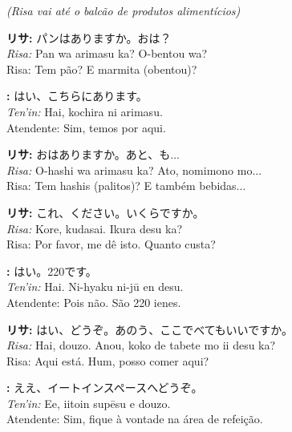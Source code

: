 \documentclass[12pt,a4paper]{article}
\begin{document}
\vspace{0.8em}
\textit{(Risa vai até o balcão de produtos alimentícios)}
\vspace{0.8em}

\textbf{リサ:} パンはありますか。おは？\\
\textit{Risa:} Pan wa arimasu ka? O-bentou wa?\\
Risa: Tem pão? E marmita (obentou)?

\vspace{0.5em}

\textbf{:} はい、こちらにあります。\\
\textit{Ten'in:} Hai, kochira ni arimasu.\\
Atendente: Sim, temos por aqui.

\vspace{0.5em}

\textbf{リサ:} おはありますか。あと、も...\\
\textit{Risa:} O-hashi wa arimasu ka? Ato, nomimono mo...\\
Risa: Tem hashis (palitos)? E também bebidas...

\vspace{0.5em}

\textbf{リサ:} これ、ください。いくらですか。\\
\textit{Risa:} Kore, kudasai. Ikura desu ka?\\
Risa: Por favor, me dê isto. Quanto custa?

\vspace{0.5em}

\textbf{:} はい。220です。\\
\textit{Ten'in:} Hai. Ni-hyaku ni-jū en desu.\\
Atendente: Pois não. São 220 ienes.

\vspace{0.5em}

\textbf{リサ:} はい、どうぞ。あのう、ここでべてもいいですか。\\
\textit{Risa:} Hai, douzo. Anou, koko de tabete mo ii desu ka?\\
Risa: Aqui está. Hum, posso comer aqui?

\vspace{0.5em}

\textbf{:} ええ、イートインスペースへどうぞ。\\
\textit{Ten'in:} Ee, iitoin supēsu e douzo.\\
Atendente: Sim, fique à vontade na área de refeição.
\end{document}
